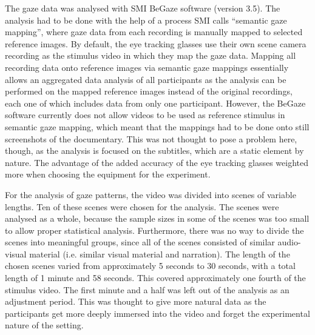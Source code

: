 \documentclass[output=paper]{langsci/langscibook}
\begin{document}
The gaze data was analysed with SMI BeGaze software (version 3.5). The analysis had to be done with the help of a process SMI calls ``semantic gaze mapping'', where gaze data from each recording is manually mapped to selected reference images. By default, the eye tracking glasses use their own scene camera recording as the stimulus video in which they map the gaze data. Mapping all recording data onto reference images via semantic gaze mappings essentially allows an aggregated data analysis of all participants as the analysis can be performed on the mapped reference images instead of the original recordings, each one of which includes data from only one participant. However, the BeGaze software currently does not allow videos to be used as reference stimulus in semantic gaze mapping, which meant that the mappings had to be done onto still screenshots of the documentary. This was not thought to pose a problem here, though, as the analysis is focused on the subtitles, which are a static element by nature. The advantage of the added accuracy of the eye tracking glasses weighted more when choosing the equipment for the experiment.

For the analysis of gaze patterns, the video was divided into scenes of variable lengths. Ten of these scenes were chosen for the analysis. The scenes were analysed as a whole, because the sample sizes in some of the scenes was too small to allow proper statistical analysis. Furthermore, there was no way to divide the scenes into meaningful groups, since all of the scenes consisted of similar audio-visual material (i.e. similar visual material and narration). The length of the chosen scenes varied from approximately 5 seconds to 30 seconds, with a total length of 1 minute and 58 seconds. This covered approximately one fourth of the stimulus video. The first minute and a half was left out of the analysis as an adjustment period. This was thought to give more natural data as the participants get more deeply immersed into the video and forget the experimental nature of the setting. 
\end{document}
